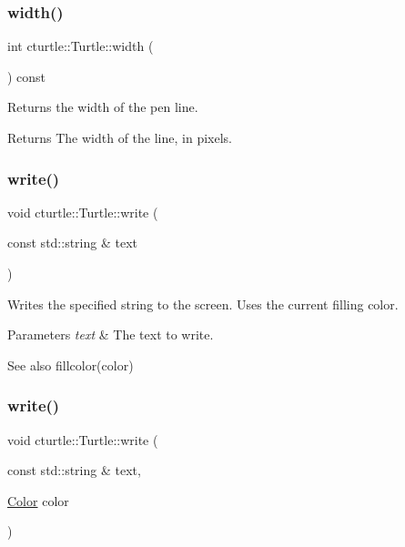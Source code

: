 \subsubsection{\texorpdfstring{width()}{width()}\hspace{0.1cm}{\footnotesize\ttfamily [2/2]}}
{\footnotesize\ttfamily int cturtle\+::\+Turtle\+::width (\begin{DoxyParamCaption}{ }\end{DoxyParamCaption}) const\hspace{0.3cm}{\ttfamily [inline]}}

Returns the width of the pen line. \begin{DoxyReturn}{Returns}
The width of the line, in pixels. 
\end{DoxyReturn}
\mbox{\label{classcturtle_1_1Turtle_a6e814845ac619a90aeee25a67a3fc51d}} 
\subsubsection{\texorpdfstring{write()}{write()}\hspace{0.1cm}{\footnotesize\ttfamily [1/2]}}
{\footnotesize\ttfamily void cturtle\+::\+Turtle\+::write (\begin{DoxyParamCaption}\item[{const std\+::string \&}]{text }\end{DoxyParamCaption})}

Writes the specified string to the screen. Uses the current filling color. 
\begin{DoxyParams}{Parameters}
{\em text} & The text to write. \\
\hline
\end{DoxyParams}
\begin{DoxySeeAlso}{See also}
fillcolor(color) 
\end{DoxySeeAlso}
\mbox{\label{classcturtle_1_1Turtle_afa05ae8897410f6ff0ed6578ddf004f3}} 
\subsubsection{\texorpdfstring{write()}{write()}\hspace{0.1cm}{\footnotesize\ttfamily [2/2]}}
{\footnotesize\ttfamily void cturtle\+::\+Turtle\+::write (\begin{DoxyParamCaption}\item[{const std\+::string \&}]{text,  }\item[{\hyperlink{classcturtle_1_1Color}{Color}}]{color }\end{DoxyParamCaption})}

